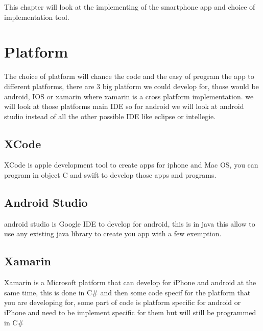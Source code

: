 This chapter will look at the implementing of the smartphone app and choice of implementation tool.

\section{Platform}
The choice of platform will chance the code and the easy of program the app to different platforms, there are 3 big platform we could develop for, those would be android, IOS or xamarin where xamarin is a cross platform implementation. we will look at those platforms main IDE so for android we will look at android studio instead of all the other possible IDE like eclipse or intellegie.

\subsection{XCode}
XCode is apple development tool to create apps for iphone and Mac OS, you can program in object C and swift to develop those apps and programs.

\subsection{Android Studio}
android studio is Google IDE to develop for android, this is in java this allow to use any existing java library to create you app with a few exemption.

\subsection{Xamarin}
Xamarin is a Microsoft platform that can develop for iPhone and android at the same time, this is done in C\# and then some code specif for the platform that you are developing for, some part of code is platform specific for android or iPhone and need to be implement specific for them but will still be programmed in C\#

